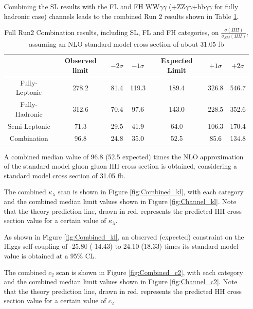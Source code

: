 Combining the SL results with the FL and FH WW$\gamma\gamma$ (+ZZ$\gamma\gamma$+bb$\gamma \gamma$ for fully hadronic case) channels leads to the combined
Run 2 results shown in Table \ref{tab:Run2Results}.

\begin{table}[h!]
  \begin{center}
    \begin{tabular}{c|c|ccccc}
      \hline
        & Observed limit & $-2\sigma$ & $-1\sigma$ & Expected Limit & $+1\sigma$ & $+2\sigma$ \\ \hline
          Fully-Leptonic &  278.2   &   81.4 & 119.3 & 189.4 & 326.8 & 546.7  \\ \hline
          Fully-Hadronic &  312.6  &   70.4 & 97.6 & 143.0 & 228.5 & 352.6   \\ \hline
          Semi-Leptonic  &  71.3  &   29.5 & 41.9 & 64.0 & 106.3 & 170.4 \\ \hline
          Combination    &  96.8  &   24.8 & 35.0 & 52.5 & 85.6 & 134.8  \\ \hline
          \end{tabular}
  \end{center}
  \caption{Full Run2 Combination results, including SL, FL and FH categories,
  on $\frac{\sigma(HH)}{\sigma_{SM}(HH)}$, assuming an NLO standard model cross section of about 31.05 fb}
  \label{tab:Run2Results}
\end{table}  

A combined median value of 96.8 (52.5 expected) times the NLO approximation of the standard model gluon gluon HH cross section is obtained, considering a standard model cross section of 31.05 fb. 

The combined $\kappa_{\lambda}$ scan is shown in Figure \ref{fig:Combined_kl}, with each category and the combined median limit values shown
in Figure \ref{fig:Channel_kl}. Note that the theory prediction line, drawn in red, represents the predicted HH cross section value for a certain value of $\kappa_{\lambda}$.

As shown in Figure \ref{fig:Combined_kl}, an observed (expected) constraint on the Higgs self-coupling of -25.80 (-14.43) to 24.10 (18.33) times its standard model value 
is obtained at a 95\% CL. 

The combined $c_{2}$ scan is shown in Figure \ref{fig:Combined_c2}, with each category and the combined median limit values shown
in Figure \ref{fig:Channel_c2}. Note that the theory prediction line, drawn in red, represents the predicted HH cross section value for a certain value of $c_{2}$.

